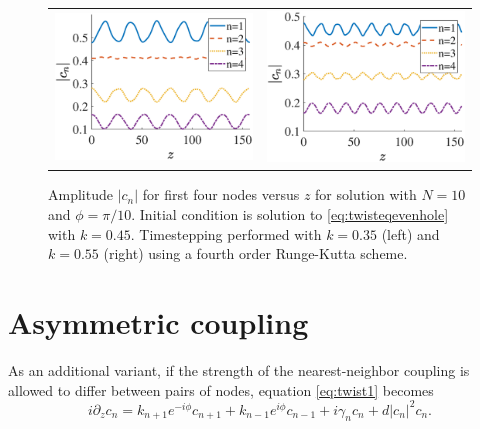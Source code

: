 \documentclass[12pt,reqno]{amsart}
\begin{document}
\begin{figure}[H]
\begin{center}
\begin{tabular}{cc}
\includegraphics[width=7.5cm]{images/even10pertk45to35} & 
\includegraphics[width=7.5cm]{images/even10pertk45to55}
\end{tabular}
\end{center}
\caption{Amplitude $|c_n|$ for first four nodes versus $z$ for solution with $N=10$ and $\phi = \pi/10$. Initial condition is solution to \cref{eq:twisteqevenhole} with $k = 0.45$. Timestepping performed with $k = 0.35$ (left) and $k = 0.55$ (right) using a fourth order Runge-Kutta scheme.}
\label{fig:evenholekperturbed}
\end{figure}

\section{Asymmetric coupling}\label{sec:variants}

As an additional variant, if the strength of the nearest-neighbor coupling is allowed to differ between pairs of nodes, equation \cref{eq:twist1} becomes
\begin{equation}\label{eq:twistk}
i \partial_z c_n = k_{n+1} e^{-i\phi}c_{n+1} + k_{n-1} e^{i\phi}c_{n-1} + i \gamma_n c_n + d |c_n|^2 c_n.
\end{equation}
\end{document}
